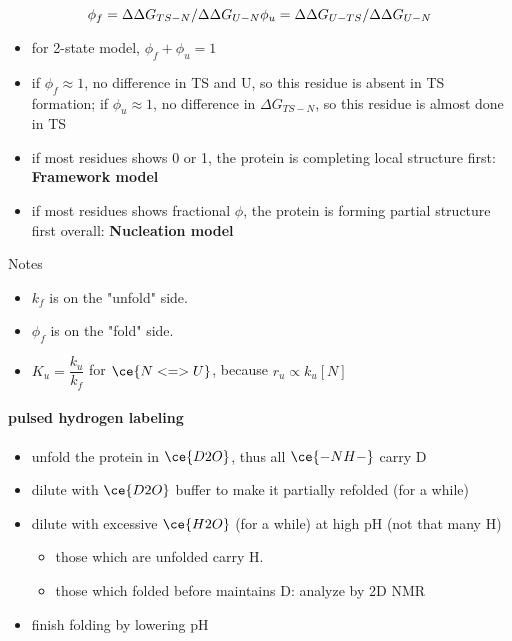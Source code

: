 \documentclass[]{article}
\let\oldparagraph\paragraph
\renewcommand{\paragraph}[1]{\oldparagraph{#1}\mbox{}}
\begin{document}
\[\phi_f=\Delta\Delta G_{TS-N}/\Delta\Delta G_{U-N}\\
\phi_u=\Delta\Delta G_{U-TS}/\Delta\Delta G_{U-N}\]

\begin{itemize}
\item
  for 2-state model, \(\phi_f+\phi_u=1\)
\item
  if \(\phi_f\approx1\), no difference in TS and U, so this residue is
  absent in TS formation; if \(\phi_u\approx1\), no difference in
  \(\Delta G_{TS-N}\), so this residue is almost done in TS
\item
  if most residues shows 0 or 1, the protein is completing local
  structure first: \textbf{Framework model}
\item
  if most residues shows fractional \(\phi\), the protein is forming
  partial structure first overall: \textbf{Nucleation model}
\end{itemize}

Notes

\begin{itemize}
\item
  \(k_f\) is on the "unfold" side.
\item
  \(\phi_f\) is on the "fold" side.
\item
  \(K_u=\dfrac{k_u}{k_f}\) for \(\ce{N<=>U}\), because
  \(r_u\propto k_u[N]\)
\end{itemize}

\hypertarget{pulsed-hydrogen-labeling}{%
\paragraph{pulsed hydrogen labeling}\label{pulsed-hydrogen-labeling}}

\begin{itemize}
\item
  unfold the protein in \(\ce{D2O}\), thus all \(\ce{-NH-}\) carry D
\item
  dilute with \(\ce{D2O}\) buffer to make it partially refolded (for a
  while)
\item
  dilute with excessive \(\ce{H2O}\) (for a while) at high pH (not that
  many H)

  \begin{itemize}
  \item
    those which are unfolded carry H.
  \item
    those which folded before maintains D: analyze by 2D NMR
  \end{itemize}
\item
  finish folding by lowering pH
\end{itemize}
\end{document}
